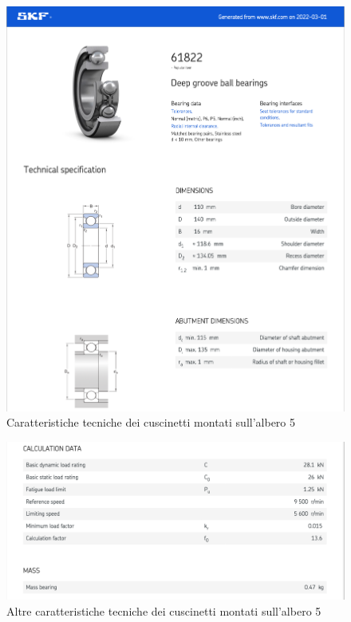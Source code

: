 \newpage
\begin{figure}[h]
    \centering
    \includegraphics[scale=0.6]{Immagini/Cuscinetti3Albero5.png}
    \caption{Caratteristiche tecniche dei cuscinetti montati sull'albero 5}
    \label{fig:Cuscinetti3Albero5}
\end{figure}
\newpage
\begin{figure}[h]
    \centering
    \includegraphics[scale=0.6]{Immagini/Cuscinetti4Albero5.png}
    \caption{Altre caratteristiche tecniche dei cuscinetti montati sull'albero 5}
        \label{fig:Cuscinetti4Albero5}
\end{figure}

